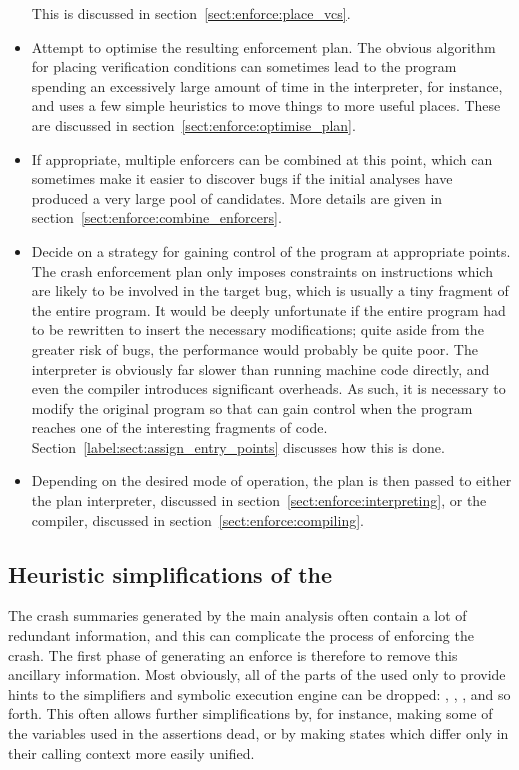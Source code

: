 \begin{itemize}
  This is discussed in section~\ref{sect:enforce:place_vcs}.
\item
  Attempt to optimise the resulting enforcement plan.  The obvious
  algorithm for placing verification conditions can sometimes lead to
  the program spending an excessively large amount of time in the
  interpreter, for instance, and {\technique} uses a few simple
  heuristics to move things to more useful places.  These are
  discussed in section~\ref{sect:enforce:optimise_plan}.
\item
  If appropriate, multiple enforcers can be combined at this point,
  which can sometimes make it easier to discover bugs if the initial
  analyses have produced a very large pool of candidates.  More
  details are given in section~\ref{sect:enforce:combine_enforcers}.
\item
  Decide on a strategy for gaining control of the program at
  appropriate points.  The crash enforcement plan only imposes
  constraints on instructions which are likely to be involved in the
  target bug, which is usually a tiny fragment of the entire program.
  It would be deeply unfortunate if the entire program had to be
  rewritten to insert the necessary modifications; quite aside from
  the greater risk of bugs, the performance would probably be quite
  poor.  The interpreter is obviously far slower than running machine
  code directly, and even the compiler introduces significant
  overheads.  As such, it is necessary to modify the original program
  so that {\technique} can gain control when the program reaches one
  of the interesting fragments of code.
  Section~\ref{label:sect:assign_entry_points} discusses how this is
  done.

\item
  Depending on the desired mode of operation, the plan is then passed
  to either the plan interpreter, discussed in
  section~\ref{sect:enforce:interpreting}, or the compiler, discussed
  in section~\ref{sect:enforce:compiling}.
\end{itemize}

\subsection{Heuristic simplifications of the {\StateMachines} }
\label{sect:enforce:heuristic_simplify}

The crash summaries generated by the main analysis often contain a lot
of redundant information, and this can complicate the process of
enforcing the crash.  The first phase of generating an enforce is
therefore to remove this ancillary information.  Most obviously, all
of the parts of the {\StateMachines} used only to provide hints to the
simplifiers and symbolic execution engine can be dropped:
, , , and so forth.
This often allows further simplifications by, for instance, making
some of the variables used in the assertions dead, or by making states
which differ only in their calling context more easily unified.

